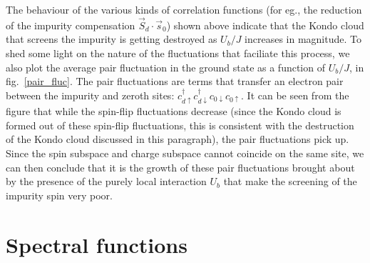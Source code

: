 The behaviour of the various kinds of correlation functions (for eg., the reduction of the impurity compensation \(\vec{S}_d\cdot\vec{s}_0\)) shown above indicate that the Kondo cloud that screens the impurity is getting destroyed as \(U_b/J\) increases in magnitude. To shed some light on the nature of the fluctuations that faciliate this process, we also plot the average pair fluctuation in the ground state as a function of \(U_b/J\), in fig.~\ref{pair_fluc}. The pair fluctuations are terms that transfer an electron pair between the impurity and zeroth sites: \(c^\dagger_{d \uparrow}c^\dagger_{d \downarrow} c_{0 \downarrow}c_{0 \uparrow}\). It can be seen from the figure that while the spin-flip fluctuations decrease (since the Kondo cloud is formed out of these spin-flip fluctuations, this is consistent with the destruction of the Kondo cloud discussed in this paragraph), the pair fluctuations pick up. Since the spin subspace and charge subspace cannot coincide on the same site, we can then conclude that it is the growth of these pair fluctuations brought about by the presence of the purely local interaction \(U_b\) that make the screening of the impurity spin very poor.

\section{Spectral functions}

